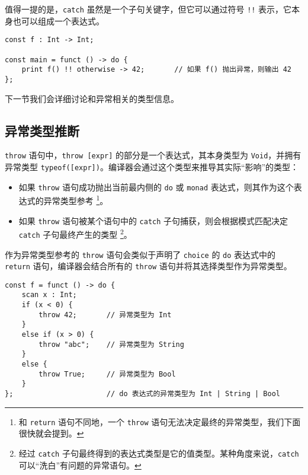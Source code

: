 值得一提的是，\lstinline!catch! 虽然是一个子句关键字，但它可以通过符号 \lstinline|!!| 表示，它本身也可以组成一个表达式。

\begin{minipage}[c]{0.95\textwidth}
\vspace{1.0em}
\begin{lstlisting}
const f : Int -> Int;

const main = funct () -> do {
    print f() !! otherwise -> 42;		// 如果 f() 抛出异常，则输出 42
};
\end{lstlisting}
\end{minipage}

下一节我们会详细讨论和异常相关的类型信息。

\subsection{异常类型推断}

\lstinline!throw! 语句中，\lstinline!throw [expr]! 的部分是一个表达式，其本身类型为 \lstinline!Void!，并拥有异常类型 \lstinline!typeof([expr])!。编译器会通过这个类型来推导其实际“影响”的类型：

\begin{itemize}
	\item 如果 \lstinline!throw! 语句成功抛出当前最内侧的 \lstinline!do! 或 \lstinline!monad! 表达式，则其作为这个表达式的异常类型参考 \footnote{和 \lstinline!return! 语句不同地，一个 \lstinline!throw! 语句无法决定最终的异常类型，我们下面很快就会提到。}。
	\item 如果 \lstinline!throw! 语句被某个语句中的 \lstinline!catch! 子句捕获，则会根据模式匹配决定 \lstinline!catch! 子句最终产生的类型 \footnote{经过 \lstinline!catch! 子句最终得到的表达式类型是它的值类型。某种角度来说，\lstinline!catch! 可以“洗白”有问题的异常语句。}。
\end{itemize}

作为异常类型参考的 \lstinline!throw! 语句会类似于声明了 \lstinline!choice! 的 \lstinline!do! 表达式中的 \lstinline!return! 语句，编译器会结合所有的 \lstinline!throw! 语句并将其选择类型作为异常类型。

\begin{lstlisting}
const f = funct () -> do {
	scan x : Int;
	if (x < 0) {
		throw 42;		// 异常类型为 Int
	}
	else if (x > 0) {
		throw "abc";	// 异常类型为 String
	}
	else {
		throw True;		// 异常类型为 Bool
	}
};						// do 表达式的异常类型为 Int | String | Bool
\end{lstlisting}

